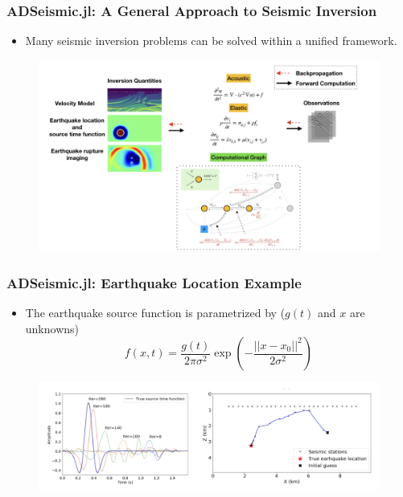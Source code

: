 \documentclass{beamer}
\begin{document}



\begin{frame}
	\frametitle{ADSeismic.jl: A General Approach to Seismic Inversion}
	\begin{itemize}
		\item Many seismic inversion problems can be solved within a unified framework. 
	\end{itemize}
	\begin{figure}[hbt]
  \includegraphics[width=1.0\textwidth]{../adseimic.jpeg}
\end{figure}
	
\end{frame}

\begin{frame}
	\frametitle{ADSeismic.jl: Earthquake Location Example}
	\begin{itemize}
		\item The earthquake source function is parametrized by ($g(t)$ and $x$ are unknowns)
		$$f(x, t) =  \frac{g(t)}{2\pi \sigma^2} \exp \left( -\frac{||x - x_0||^2}{2 \sigma^2} \right)$$
	\end{itemize}
	\begin{figure}[hbt]
  \includegraphics[width=1.0\textwidth]{../source_time}
\end{figure}
\end{frame}
\end{document}
